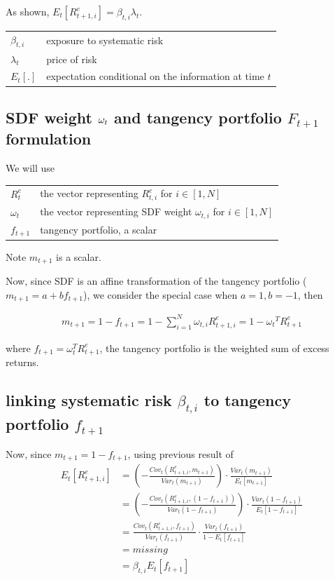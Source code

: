 \documentclass[11pt, oneside]{article}   	%
\begin{document}
As shown, $E_t\left[ R^e_{t+1, i}  \right] = \beta_{t, i}\lambda_t$.

\begin{tabular}{l @{ := } l}
    $\beta_{t,i}$ & exposure to systematic risk \\
    $\lambda_t$ & price of risk \\
    $E_t[.]$  & expectation conditional on the information at time $t$
\end{tabular}

\subsection{SDF weight $\boldmath{\omega_t}$ and tangency portfolio $F_{t+1}$ formulation}

We will use

\begin{tabular}{l @{ := } l}
    $R^e_t$ & the vector representing $R^e_{t, i}$ for $i\in[1, N]$\\
    $\omega_t$ & the vector representing SDF weight $\omega_{t, i}$ for $i\in[1, N]$ \\
    $f_{t+1}$ & tangency portfolio, a scalar
\end{tabular}

Note $m_{t+1}$ is a scalar.

Now, since SDF is an affine transformation of the tangency portfolio ($m_{t+1} = a + b{f_{t+1}}$), we consider the
special case when $a=1, b=-1$, then

\begin{align*}
    m_{t+1} = 1 - f_{t+1} = 1 - \sum_{i=1}^N \omega_{t, i} R^e_{t+1, i} = 1 - {\omega_t}^T {R^e_{t+1}}
\end{align*}

where $f_{t+1} = \omega_t^TR^e_{t+1}$, the tangency portfolio is the weighted sum of excess returns.

\subsection{linking systematic risk $\beta_{t,i}$ to tangency portfolio $f_{t+1}$}

Now, since $m_{t+1} = 1 - f_{t+1}$, using previous result of 
\begin{align*}
    E_t[R^e_{t+1, i}] &= \left( - \frac{Cov_t(R^e_{t+1, i}, m_{t+1})}{Var_t(m_{t+1})}  \right) \cdot
    \frac{Var_t(m_{t+1})}{E_t[m_{t+1}]} \\
                      &= \left( - \frac{Cov_t(R^e_{t+1, i},(1-f_{t+1}))}{Var_t(1-f_{t+1})} \right) \cdot 
                      \frac{Var_t(1-f_{t+1})}{E_t[1-f_{t+1}]} \\
                      &= \frac{Cov_t(R^e_{t+1, i}, f_{t+1})}{Var_t(f_{t+1})} \cdot \frac{Var_t(f_{t+1})}{1 -
                      E_t[f_{t+1}]} \\
                      &= missing \\
                      &= \beta_{t, i} E_t[f_{t+1}]
\end{align*}
\end{document}

